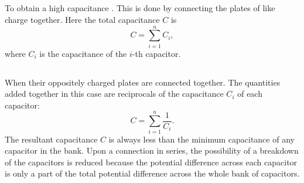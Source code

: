 \subsection{}\label{17.2.9} To obtain a high capacitance . This is done by connecting the plates of like charge together. Here the total capacitance $C$ is
\begin{equation*}%
C = \sum_{i = 1}^{n} C_{i},
\end{equation*}
where $C_{i}$ is the capacitance of the $i$-th capacitor.

\subsection{}\label{17.2.10} When  their oppositely charged plates are connected together. The quantities added together in this case are reciprocals of the capacitance $C_{i}$ of each capacitor:
\begin{equation*}%
C = \sum_{i = 1}^{n} \frac{1}{C_{i}}.
\end{equation*}
The resultant capacitance $C$ is always less than the minimum capacitance of any capacitor in the bank. Upon a connection in series, the possibility of a breakdown  of the capacitors is reduced because the potential difference across each capacitor is only a part of the total potential difference across the whole bank of capacitors.






